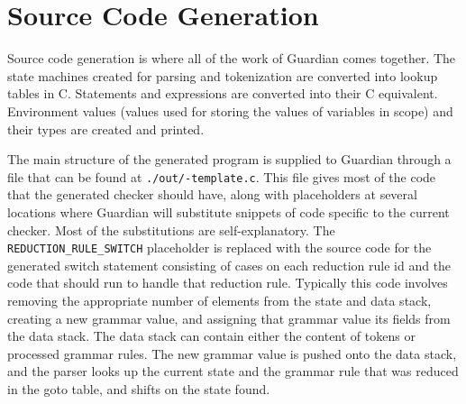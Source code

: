 
\section{Source Code Generation}
{
	Source code generation is where all of the work of Guardian comes together.
	The state machines created for parsing and tokenization
	are converted into lookup tables
	in C. Statements and expressions are converted into their C equivalent.
	Environment values (values used for storing the values of variables
	in scope) and their types are created and printed.
	
	The main structure of the generated program is supplied to Guardian
	through a file that can be found at \texttt{./out/-template.c}.
	This file gives most of the code that the
	generated checker should have, along with placeholders
	at several locations where Guardian will
	substitute snippets of code specific
	to the current checker.
	Most of the substitutions are self-explanatory.
	The \texttt{REDUCTION\_RULE\_SWITCH} placeholder is replaced
	with the source code for the generated switch statement
	consisting of cases on each reduction rule id and the code that
	should run to handle that reduction rule.
	Typically this code involves removing
	the appropriate number of
	elements from the state and data stack,
	creating a new grammar value,
	and assigning that grammar value its fields from
	the data stack. The data stack can
	contain either the content
	of tokens or processed grammar rules.
	The new grammar value is pushed onto the data stack, and
	the parser looks up the current state and the grammar rule that was reduced
	in the goto table, and shifts on the state found.
}



















